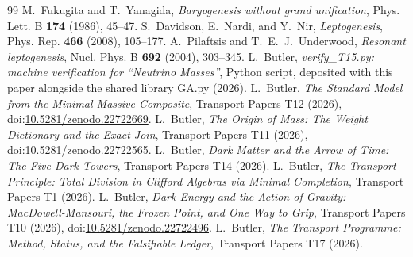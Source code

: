 \documentclass[11pt]{article}
\theoremstyle{definition}
\theoremstyle{plain}
\begin{document}
\begin{thebibliography}{99}
 M.~Fukugita and T.~Yanagida,
\emph{Baryogenesis without grand unification},
Phys. Lett. B \textbf{174} (1986), 45--47.
 S.~Davidson, E.~Nardi, and Y.~Nir,
\emph{Leptogenesis},
Phys. Rep. \textbf{466} (2008), 105--177.
 A.~Pilaftsis and T.~E.~J.~Underwood,
\emph{Resonant leptogenesis},
Nucl. Phys. B \textbf{692} (2004), 303--345.
 L.~Butler,
\emph{verify\_T15.py: machine verification for ``Neutrino Masses''},
Python script, deposited with this paper alongside the shared library GA.py (2026).
 L.~Butler,
\emph{The Standard Model from the Minimal Massive Composite},
Transport Papers T12 (2026), doi:\href{https://doi.org/10.5281/zenodo.22722669}{10.5281/zenodo.22722669}.
 L.~Butler,
\emph{The Origin of Mass: The Weight Dictionary and the Exact Join},
Transport Papers T11 (2026), doi:\href{https://doi.org/10.5281/zenodo.22722565}{10.5281/zenodo.22722565}.
 L.~Butler,
\emph{Dark Matter and the Arrow of Time: The Five Dark Towers},
Transport Papers T14 (2026).
 L.~Butler,
\emph{The Transport Principle: Total Division in Clifford Algebras via Minimal Completion},
Transport Papers T1 (2026).
 L.~Butler,
\emph{Dark Energy and the Action of Gravity: MacDowell-Mansouri, the Frozen Point, and One Way to Grip},
Transport Papers T10 (2026), doi:\href{https://doi.org/10.5281/zenodo.22722496}{10.5281/zenodo.22722496}.
 L.~Butler,
\emph{The Transport Programme: Method, Status, and the Falsifiable Ledger},
Transport Papers T17 (2026).
\end{thebibliography}
\end{document}
